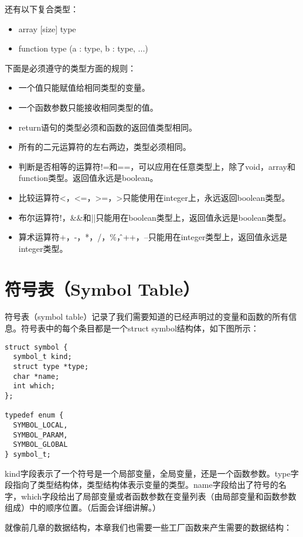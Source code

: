 \documentclass[cn,11pt,chinese]{elegantbook}
\begin{document}
还有以下复合类型：

\begin{itemize}
  \item array [size] type
  \item function type (a : type, b :  type, ...)
\end{itemize}

下面是必须遵守的类型方面的规则：

\begin{itemize}
  \item 一个值只能赋值给相同类型的变量。
  \item 一个函数参数只能接收相同类型的值。
  \item return语句的类型必须和函数的返回值类型相同。
  \item 所有的二元运算符的左右两边，类型必须相同。
  \item 判断是否相等的运算符!=和==，可以应用在任意类型上，除了void，array和function类型。返回值永远是boolean。
  \item 比较运算符<，<=，>=，>只能使用在integer上，永远返回boolean类型。
  \item 布尔运算符!，\&\&和||只能用在boolean类型上，返回值永远是boolean类型。
  \item 算术运算符+，-，*，/，\%，\^，++，--只能用在integer类型上，返回值永远是integer类型。
\end{itemize}

\section{符号表（Symbol Table）}

符号表（symbol table）记录了我们需要知道的已经声明过的变量和函数的所有信息。符号表中的每个条目都是一个struct symbol结构体，如下图所示：

\begin{verbatim}
struct symbol {
  symbol_t kind;
  struct type *type;
  char *name;
  int which;
};

typedef enum {
  SYMBOL_LOCAL,
  SYMBOL_PARAM,
  SYMBOL_GLOBAL
} symbol_t;
\end{verbatim}

kind字段表示了一个符号是一个局部变量，全局变量，还是一个函数参数。type字段指向了类型结构体，类型结构体表示变量的类型。name字段给出了符号的名字，which字段给出了局部变量或者函数参数在变量列表（由局部变量和函数参数组成）中的顺序位置。（后面会详细讲解。）

就像前几章的数据结构，本章我们也需要一些工厂函数来产生需要的数据结构：
\end{document}

